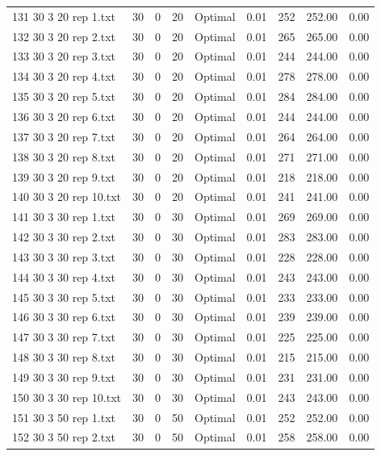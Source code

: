 \begin{longtable}{lrrllrrrr}
131 30 3 20 rep 1.txt & 30 & 0 & 20 & Optimal &  0.01 & 252 & 252.00 &  0.00\\
132 30 3 20 rep 2.txt & 30 & 0 & 20 & Optimal &  0.01 & 265 & 265.00 &  0.00\\
133 30 3 20 rep 3.txt & 30 & 0 & 20 & Optimal &  0.01 & 244 & 244.00 &  0.00\\
134 30 3 20 rep 4.txt & 30 & 0 & 20 & Optimal &  0.01 & 278 & 278.00 &  0.00\\
135 30 3 20 rep 5.txt & 30 & 0 & 20 & Optimal &  0.01 & 284 & 284.00 &  0.00\\
136 30 3 20 rep 6.txt & 30 & 0 & 20 & Optimal &  0.01 & 244 & 244.00 &  0.00\\
137 30 3 20 rep 7.txt & 30 & 0 & 20 & Optimal &  0.01 & 264 & 264.00 &  0.00\\
138 30 3 20 rep 8.txt & 30 & 0 & 20 & Optimal &  0.01 & 271 & 271.00 &  0.00\\
139 30 3 20 rep 9.txt & 30 & 0 & 20 & Optimal &  0.01 & 218 & 218.00 &  0.00\\
140 30 3 20 rep 10.txt & 30 & 0 & 20 & Optimal &  0.01 & 241 & 241.00 &  0.00\\
141 30 3 30 rep 1.txt & 30 & 0 & 30 & Optimal &  0.01 & 269 & 269.00 &  0.00\\
142 30 3 30 rep 2.txt & 30 & 0 & 30 & Optimal &  0.01 & 283 & 283.00 &  0.00\\
143 30 3 30 rep 3.txt & 30 & 0 & 30 & Optimal &  0.01 & 228 & 228.00 &  0.00\\
144 30 3 30 rep 4.txt & 30 & 0 & 30 & Optimal &  0.01 & 243 & 243.00 &  0.00\\
145 30 3 30 rep 5.txt & 30 & 0 & 30 & Optimal &  0.01 & 233 & 233.00 &  0.00\\
146 30 3 30 rep 6.txt & 30 & 0 & 30 & Optimal &  0.01 & 239 & 239.00 &  0.00\\
147 30 3 30 rep 7.txt & 30 & 0 & 30 & Optimal &  0.01 & 225 & 225.00 &  0.00\\
148 30 3 30 rep 8.txt & 30 & 0 & 30 & Optimal &  0.01 & 215 & 215.00 &  0.00\\
149 30 3 30 rep 9.txt & 30 & 0 & 30 & Optimal &  0.01 & 231 & 231.00 &  0.00\\
150 30 3 30 rep 10.txt & 30 & 0 & 30 & Optimal &  0.01 & 243 & 243.00 &  0.00\\
151 30 3 50 rep 1.txt & 30 & 0 & 50 & Optimal &  0.01 & 252 & 252.00 &  0.00\\
152 30 3 50 rep 2.txt & 30 & 0 & 50 & Optimal &  0.01 & 258 & 258.00 &  0.00\\

\end{longtable}
